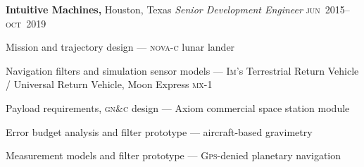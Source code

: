 \documentclass[12pt,letterpaper]{article}
\newenvironment{itemize*}%
{\begin{itemize}%
  \setlength{\itemsep}{0pt}}%
{\end{itemize}}
\newcommand{\rdate}[1]{{\hfill #1}}
\begin{document}
\medskip
\textbf{Intuitive Machines,} Houston, Texas \newline
\emph{Senior Development Engineer} \rdate{\textsc{jun}~2015--\textsc{oct}~2019}
\begin{itemize*}
  \item Mission and trajectory design --- \textsc{nova-c} lunar lander
  \item Navigation filters and simulation sensor models --- \textsc{Im}'s Terrestrial Return Vehicle / Universal Return Vehicle, Moon Express \textsc{mx}-1
  \item Payload requirements, \textsc{gn\&c} design --- Axiom commercial space station module
  \item Error budget analysis and filter prototype --- aircraft-based gravimetry
  \item Measurement models and filter prototype --- \textsc{Gps}-denied planetary navigation
\end{itemize*}
\end{document}
